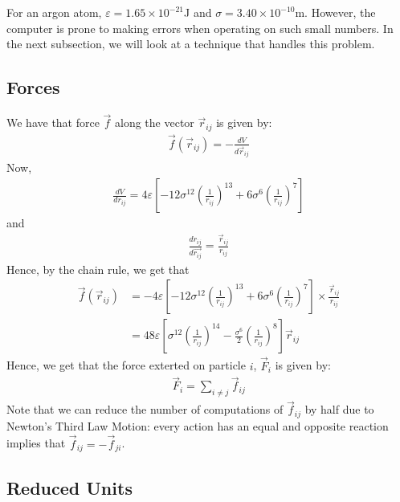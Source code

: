 \documentclass[../Main.tex]{subfiles}
\begin{document}
For an argon atom, $\varepsilon = 1.65 \times 10^{-21}$J and $\sigma = 3.40 \times 10^{-10}$m. However, the computer is prone to making errors when operating on such small numbers. In the next subsection, we will look at a technique that handles this problem.

\subsection{Forces}

We have that force $\vec{f}$ along the vector $\vec{r}_{ij}$ is given by:
\begin{align*}
\vec{f}\left(\vec{r}_{ij}\right) = -\frac{dV}{d\vec{r}_{ij}}
\end{align*}
Now,
\begin{align*}
\frac{dV}{dr_{ij}} = 4\varepsilon \left[ -12\sigma^{12}\left( \frac{1}{r_{ij}}\right)^{13} + 6\sigma^{6}\left( \frac{1}{r_{ij}}\right)^{7}\right]
\end{align*}
and
\begin{align*}
\frac{dr_{ij}}{d\vec{r_{ij}}} = \frac{\vec{r}_{ij}}{r_{ij}}
\end{align*}
Hence, by the chain rule, we get that
\begin{align}
\vec{f}\left(\vec{r}_{ij}\right) & = -4\varepsilon \left[ -12\sigma^{12}\left( \frac{1}{r_{ij}}\right)^{13} + 6\sigma^{6}\left( \frac{1}{r_{ij}}\right)^{7}\right] \times \frac{\vec{r}_{ij}}{r_{ij}} \nonumber \\
& = 48\varepsilon \left[ \sigma^{12}\left( \frac{1}{r_{ij}}\right)^{14} - \frac{\sigma^{6}}{2}\left( \frac{1}{r_{ij}}\right)^{8}\right]\vec{r}_{ij} \label{eqn:lennard-jones_force_one_atom}
\end{align}
Hence, we get that the force exterted on particle $i$, $\vec{F}_{i}$ is given by:
\begin{align*}
	\vec{F}_{i} = \sum_{i \neq j} \vec{f}_{ij}
\end{align*}
Note that we can reduce the number of computations of $\vec{f}_{ij}$ by half due to Newton's Third Law Motion: every action has an equal and opposite reaction implies that $\vec{f}_{ij} = -\vec{f}_{ji}$.

\subsection{Reduced Units}
\end{document}
